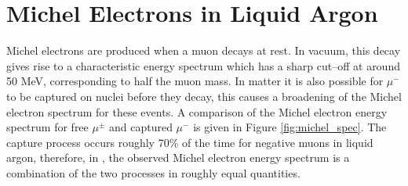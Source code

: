 \section{Michel Electrons in Liquid Argon} \label{ME_LAr}
Michel electrons are produced when a muon decays at rest. In vacuum, this
decay gives rise to a characteristic energy spectrum which has a sharp
cut--off at around 50 MeV, corresponding to half the muon mass. In matter it
is also possible for $\mu^-$ to be captured on nuclei before they decay, this
causes a broadening of the Michel electron spectrum for these events. A
comparison of the Michel electron energy spectrum for free $\mu^\pm$ and
captured $\mu^-$ is given in Figure \ref{fig:michel_spec}. The capture process
occurs roughly 70\% of the time for negative muons in liquid argon, therefore,
in \protodune{}, the observed Michel electron energy spectrum is a combination
of the two processes in roughly equal quantities.

